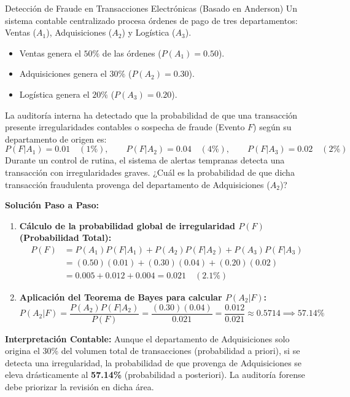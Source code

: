 \begin{ejemplo}{Detección de Fraude en Transacciones Electrónicas (Basado en Anderson)}
Un sistema contable centralizado procesa órdenes de pago de tres departamentos: Ventas ($A_1$), Adquisiciones ($A_2$) y Logística ($A_3$).
\begin{itemize}
    \item Ventas genera el $50\%$ de las órdenes ($P(A_1) = 0.50$).
    \item Adquisiciones genera el $30\%$ ($P(A_2) = 0.30$).
    \item Logística genera el $20\%$ ($P(A_3) = 0.20$).
\end{itemize}
La auditoría interna ha detectado que la probabilidad de que una transacción presente irregularidades contables o sospecha de fraude (Evento $F$) según su departamento de origen es:
\[
P(F|A_1) = 0.01 \quad (1\%), \qquad P(F|A_2) = 0.04 \quad (4\%), \qquad P(F|A_3) = 0.02 \quad (2\%)
\]
Durante un control de rutina, el sistema de alertas tempranas detecta una transacción con irregularidades graves. ¿Cuál es la probabilidad de que dicha transacción fraudulenta provenga del departamento de Adquisiciones ($A_2$)?

\tcbline
\textbf{Solución Paso a Paso:}
\begin{enumerate}
    \item \textbf{Cálculo de la probabilidad global de irregularidad $P(F)$ (Probabilidad Total):}
    \begin{align*}
        P(F) &= P(A_1)P(F|A_1) + P(A_2)P(F|A_2) + P(A_3)P(F|A_3) \\
        &= (0.50)(0.01) + (0.30)(0.04) + (0.20)(0.02) \\
        &= 0.005 + 0.012 + 0.004 = 0.021 \quad (2.1\%)
    \end{align*}
    \item \textbf{Aplicación del Teorema de Bayes para calcular $P(A_2|F)$:}
    \[
    P(A_2|F) = \frac{P(A_2)P(F|A_2)}{P(F)} = \frac{(0.30)(0.04)}{0.021} = \frac{0.012}{0.021} \approx 0.5714 \implies 57.14\%
    \]
\end{enumerate}
\textbf{Interpretación Contable:} Aunque el departamento de Adquisiciones solo origina el 30\% del volumen total de transacciones (probabilidad a priori), si se detecta una irregularidad, la probabilidad de que provenga de Adquisiciones se eleva drásticamente al \textbf{57.14\%} (probabilidad a posteriori). La auditoría forense debe priorizar la revisión en dicha área.
\end{ejemplo}

